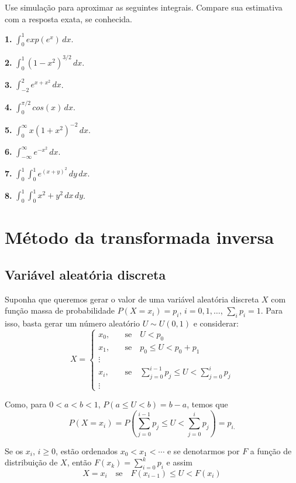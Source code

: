 \documentclass[
]{book}
\begin{document}
Use simulação para aproximar as seguintes integrais. Compare sua
estimativa com a resposta exata, se conhecida.

\textbf{1.} \(\int_{0}^{1}exp(e^x)\, dx\).

\textbf{2.} \(\int_{0}^{1}(1-x^2)^{3/2}\, dx\).

\textbf{3.} \(\int_{-2}^{2}e^{x+x^2}\, dx\).

\textbf{4.} \(\int_{0}^{\pi/2} cos(x)\, dx\).

\textbf{5.} \(\int_{0}^{\infty}x(1+x^2)^{-2}\, dx\).

\textbf{6.} \(\int_{-\infty}^{\infty}e^{-x^2}\, dx\).

\textbf{7.} \(\int_{0}^{1}\int_{0}^{1}e^{(x+y)^2}\,dy\,dx\).

\textbf{8.} \(\int_0^1 \int_0^1 x^2 + y^2 \, dx \, dy\).

\chapter{Método da transformada inversa}\label{muxe9todo-da-transformada-inversa}

\section{Variável aleatória discreta}\label{variuxe1vel-aleatuxf3ria-discreta}

Suponha que queremos gerar o valor de uma variável aleatória discreta
\(X\) com função massa de probabilidade \(P(X = x_{i}) = p_{i}\),
\(i=0,1,\ldots\), \(\sum_{i}p_{i}=1\). Para isso, basta gerar um número
aleatório \(U \sim U(0,1)\) e considerar: \[X = \begin{cases}
x_{0},& \quad \text{se} \quad U<p_{0} \\
x_{1},& \quad \text{se} \quad p_{0}\leq U <p_{0}+p_{1}\\
\vdots& \\
x_{i},& \quad \text{se} \quad \sum_{j=0}^{i-1}p_{j}\leq U < \sum_{j=0}^{i}p_{j} \\
\vdots
\end{cases}\]

Como, para \(0<a<b<1\), \(P(a\leq U<b)=b-a\), temos que
\[P(X=x_{i}) = P\left( \sum_{j=0}^{i-1}p_{j} \leq U < \sum_{j=0}^{i}p_{j} \right) = p_{i.}\]

Se os \(x_{i}\), \(i\geq 0\), estão ordenados \(x_{0}<x_{1}<\cdots\) e se
denotarmos por \(F\) a função de distribuição de \(X\), então
\(F(x_{k})=\sum_{i=0}^{k}p_{i}\) e assim
\[X = x_{i} \quad \text{se} \quad F(x_{i-1})\leq U < F(x_{i})\]
\end{document}
